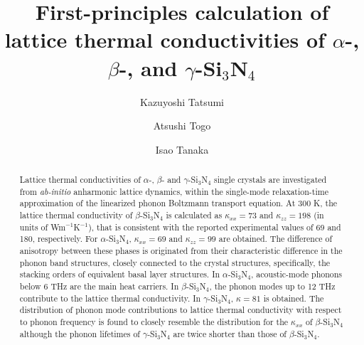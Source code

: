 \documentclass[twocolumn,amsmath,amssymb,a4paper,prb,superscriptaddress,floatfix]{revtex4-1}
\begin{document}
\title{First-principles calculation of lattice thermal
conductivities of $\alpha$-, $\beta$-, and $\gamma$-Si$_3$N$_4$}

\author{Kazuyoshi Tatsumi} 

\author{Atsushi Togo}

\author{Isao Tanaka}

\begin{abstract}
Lattice thermal conductivities of $\alpha$-, $\beta$- and $\gamma$-Si$_3$N$_4$
single crystals are investigated from {\it ab-initio} anharmonic lattice
dynamics, within the single-mode relaxation-time approximation of the linearized
phonon Boltzmann transport equation. At 300 K, the lattice thermal conductivity
of $\beta$-Si$_3$N$_4$ is calculated as $\kappa_{xx}=73$ and $\kappa_{zz}=198$
(in units of Wm$^{-1}$K$^{-1}$), that is consistent with the reported
experimental values of 69 and 180, respectively. For $\alpha$-Si$_3$N$_4$,
$\kappa_{xx}=69$ and $\kappa_{zz}=99$ are obtained.  The difference of
anisotropy between these phases is originated from their characteristic
difference in the phonon band structures, closely connected to the crystal
structures, specifically, the stacking orders of equivalent basal layer
structures.  In $\alpha$-Si$_3$N$_4$, acoustic-mode phonons below 6 THz are the
main heat carriers. In $\beta$-Si$_3$N$_4$, the phonon modes up to 12 THz
contribute to the lattice thermal conductivity. In $\gamma$-Si$_3$N$_4$,
$\kappa=81$ is obtained. The distribution of phonon mode contributions to
lattice thermal conductivity with respect to phonon frequency is found to
closely resemble the distribution for the  $\kappa_{xx}$ of $\beta$-Si$_3$N$_4$
although the phonon lifetimes of $\gamma$-Si$_3$N$_4$ are twice shorter than
those of $\beta$-Si$_3$N$_4$.
\end{abstract}
\end{document}
